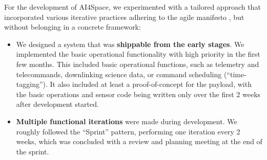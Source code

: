 \documentclass[]{iac}
\begin{document}




For the development of AI4Space, we experimented with a tailored approach that incorporated various iterative practices adhering to the agile manifesto \autocite{beck_agile_2001}, but without belonging in a concrete framework:
\begin{itemize}
\item We designed a system that was \textbf{shippable from the early stages}. We implemented the basic operational functionality with high priority in the first few months. This included basic operational functions, such as telemetry and telecommands, downlinking science data, or command scheduling (``time-tagging''). It also included at least a proof-of-concept for the payload, with the basic operations and sensor code being written only over the first 2 weeks after development started.
\item \textbf{Multiple functional iterations} were made during development.
We roughly followed the ``Sprint'' pattern, performing one iteration every 2 weeks, which was concluded with a review and planning meeting at the end of the sprint.
\end{itemize}
\end{document}
